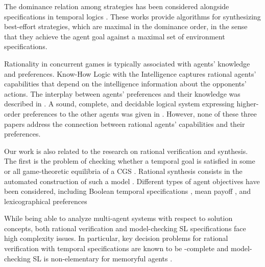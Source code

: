 The dominance relation among strategies has been considered alongside specifications in temporal logics  \cite{AminofGR21,AminofGLMR21}. These works provide algorithms for synthesizing best-effort strategies, which are maximal in the dominance order, in the sense that they achieve the agent goal against a maximal set of environment specifications.

Rationality in concurrent games is typically associated with  a\-gents' knowledge and preferences. Know-How Logic with the Intelligence \cite{naumov2021intelligence} captures rational agents' capabilities that depend on the intelligence information about the opponents’ actions. The interplay between agents' preferences and their knowledge was described in \cite{Naumov2023AnEL}. 
A sound, complete, and decidable logical system expressing higher-order preferences to the other agents was given in  \cite{Jiang2024-JIAALO}. However, none of these three papers address the connection between rational agents' capabilities and their preferences.

Our work is also related to the research on rational verification and synthesis. The first is the problem of checking whether a temporal goal is satisfied in some or all game-theoretic equilibria of a CGS \cite{AbateGHHKNPSW21,GutierrezNPW23}. Rational synthesis consists in the automated construction of such a model \cite{FismanKL10, CFGR16}. 
Different types of agent objectives have been considered, including Boolean temporal specifications \cite{gutierrez2019equilibrium}, mean payoff \cite{gutierrez2024characterising}, and lexicographical preferences \cite{gutierrez2017nash}


While being able to analyze multi-agent systems with respect to solution concepts, both rational verification and model-checking SL specifications face high complexity issues. 
In particular, key decision problems for rational verification with temporal specifications are known to be \DExptime-complete \cite{GutierrezNPW23} and model-checking  SL is non-elementary for memoryful agents \cite{MogaveroMPV14}. 

 

